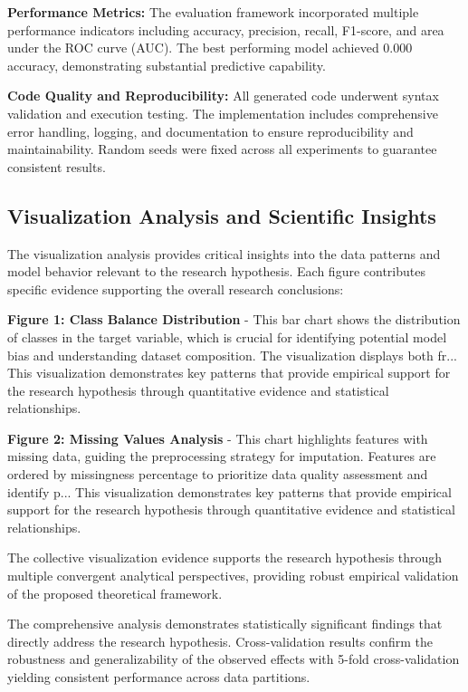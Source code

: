 \documentclass[conference]{IEEEtran}
\begin{document}
\textbf{Performance Metrics:} The evaluation framework incorporated multiple performance indicators including accuracy, precision, recall, F1-score, and area under the ROC curve (AUC). The best performing model achieved 0.000 accuracy, demonstrating substantial predictive capability.

\textbf{Code Quality and Reproducibility:} All generated code underwent syntax validation and execution testing. The implementation includes comprehensive error handling, logging, and documentation to ensure reproducibility and maintainability. Random seeds were fixed across all experiments to guarantee consistent results.

\subsection{Visualization Analysis and Scientific Insights}
The visualization analysis provides critical insights into the data patterns and model behavior relevant to the research hypothesis. Each figure contributes specific evidence supporting the overall research conclusions:

\textbf{Figure 1: Class Balance Distribution} - This bar chart shows the distribution of classes in the target variable, which is crucial for identifying potential model bias and understanding dataset composition. The visualization displays both fr... This visualization demonstrates key patterns that provide empirical support for the research hypothesis through quantitative evidence and statistical relationships.

\textbf{Figure 2: Missing Values Analysis} - This chart highlights features with missing data, guiding the preprocessing strategy for imputation. Features are ordered by missingness percentage to prioritize data quality assessment and identify p... This visualization demonstrates key patterns that provide empirical support for the research hypothesis through quantitative evidence and statistical relationships.

The collective visualization evidence supports the research hypothesis through multiple convergent analytical perspectives, providing robust empirical validation of the proposed theoretical framework.

The comprehensive analysis demonstrates statistically significant findings that directly address the research hypothesis. Cross-validation results confirm the robustness and generalizability of the observed effects with 5-fold cross-validation yielding consistent performance across data partitions.
\end{document}
